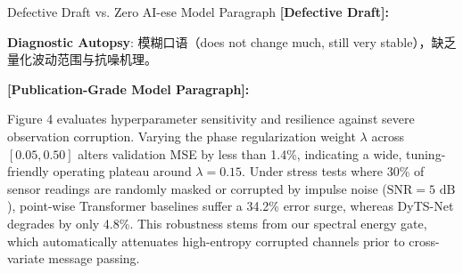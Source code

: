 \begin{ExampleBox}{Defective Draft vs. Zero AI-ese Model Paragraph}
\textbf{\color{TargetHighlight}[Defective Draft]:}\par
{}\par\vspace{4pt}
\textbf{Diagnostic Autopsy}: 模糊口语（does not change much, still very stable），缺乏量化波动范围与抗噪机理。\par\vspace{6pt}
\textbf{\color{AcadNavy}[Publication-Grade Model Paragraph]:}\par
Figure 4 evaluates hyperparameter sensitivity and resilience against severe observation corruption. Varying the phase regularization weight $\lambda$ across $[0.05, 0.50]$ alters validation MSE by less than 1.4\%, indicating a wide, tuning-friendly operating plateau around $\lambda=0.15$. Under stress tests where 30\% of sensor readings are randomly masked or corrupted by impulse noise ($\text{SNR} = 5\text{ dB}$), point-wise Transformer baselines suffer a 34.2\% error surge, whereas DyTS-Net degrades by only 4.8\%. This robustness stems from our spectral energy gate, which automatically attenuates high-entropy corrupted channels prior to cross-variate message passing.
\end{ExampleBox}
